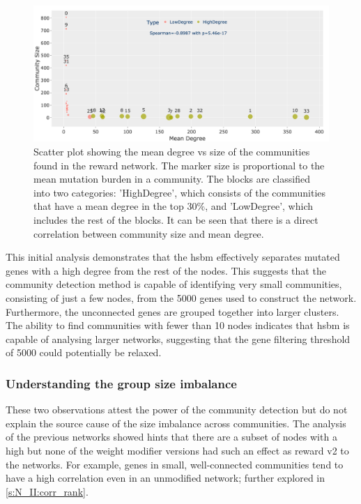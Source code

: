\begin{figure}[!b]    
    \centering
    \includegraphics[width=1.0\textwidth,height=1.0\textheight,keepaspectratio]{Sections/Network_II/resources/reward/LargeSmall_com.png}
    \caption[Community size vs Degree]{Scatter plot showing the mean degree vs size of the communities found in the reward network. The marker size is proportional to the mean mutation burden in a community. The blocks are classified into two categories: 'HighDegree', which consists of the communities that have a mean degree in the top 30\%, and 'LowDegree', which includes the rest of the blocks. It can be seen that there is a direct correlation between community size and mean degree.}
    \label{fig:N_II:largeSmall_com}
\end{figure}

This initial analysis demonstrates that the \acrlong{hsbm} effectively separates mutated genes with a high degree from the rest of the nodes. This suggests that the community detection method is capable of identifying very small communities, consisting of just a few nodes, from the 5000 genes used to construct the network. Furthermore, the unconnected genes are grouped together into larger clusters. The ability to find communities with fewer than 10 nodes indicates that \acrshort{hsbm} is capable of analysing larger networks, suggesting that the gene filtering threshold of 5000 could potentially be relaxed.

\subsubsection*{Understanding the group size imbalance}

These two observations attest the power of the community detection but do not explain the source cause of the size imbalance across communities. The analysis of the previous networks showed hints that there are a subset of nodes with a high but none of the weight modifier versions had such an effect as reward v2 to the networks. For example, genes in small, well-connected communities tend to have a high correlation even in an unmodified network; further explored in \cref{s:N_II:corr_rank}. 

